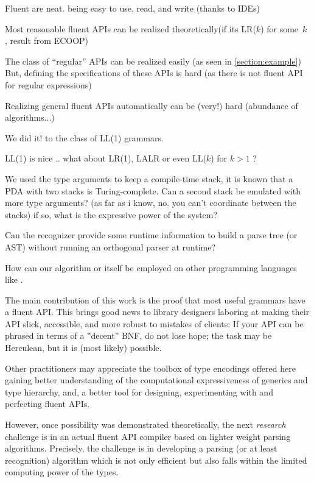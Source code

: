 
Fluent are neat. being easy to use, read, and write (thanks to IDEs)

Most reasonable fluent APIs can be realized theoretically(if its LR($k$) for some~$k$ , result from ECOOP)

The class of ``regular'' APIs can be realized easily (as seen in \cref{section:example})
But, defining the specifications of these APIs is hard (as there is not fluent API for regular expressions)

Realizing general fluent APIs automatically can be (very!) hard (abundance of algorithms...)

We did it! to the class of LL(1) grammars.


LL(1) is nice .. what about LR(1), LALR or even LL($k$) for $k>1$ ?

We used the type arguments to keep a compile-time stack,
  it is known that a PDA with two stacks is Turing-complete.
Can a second stack be emulated with more type arguments? (as far as i know, no. you can't coordinate between the stacks)
  if so, what is the expressive power of the \Java system?

Can the recognizer provide some runtime information to build a parse tree (or AST) without running 
  an orthogonal parser at runtime?

How can our algorithm or \Fajita itself be employed on other programming languages like \CS.

The main contribution of this work is the proof that
  most useful grammars have a fluent API\@.
This brings good news to library designers laboring
  at making their API slick, accessible, and more
  robust to mistakes of clients:
If your API can be phrased in terms of a ‟decent”
  BNF, do not lose hope; the task may be Herculean, but it is (most likely) possible.

Other practitioners may appreciate the toolbox of type encodings offered here
  gaining better understanding of the computational expressiveness of
  \Java generics and type hierarchy, and, a better tool
  for designing, experimenting with and perfecting fluent APIs.

However, once possibility was demonstrated theoretically, the next \emph{research}
    challenge is in an actual fluent API compiler based on lighter weight
  parsing algorithms.
Precisely, the challenge
  is in developing a parsing (or at least recognition)
  algorithm which is not only efficient but also falls within the limited computing power of the \Java types.

